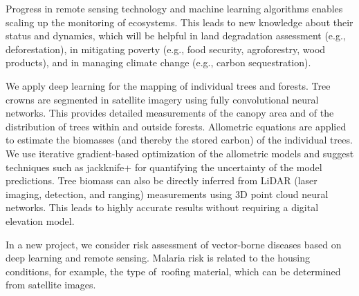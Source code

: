 \documentclass[a4paper,UKenglish]{dagrep-v2021}
\begin{document}
\license
{}

Progress in remote sensing technology and machine learning algorithms enables scaling up the monitoring of ecosystems. This leads to new knowledge about their status and dynamics, which will be helpful in land degradation assessment (e.g., deforestation), in mitigating poverty (e.g., food security, agroforestry, wood products), and in managing climate change (e.g., carbon sequestration).

We apply deep learning for the mapping of individual trees and forests. Tree crowns are segmented in satellite imagery using fully convolutional neural networks. This provides detailed measurements of the canopy area and of the distribution of trees within and outside forests. Allometric equations are applied to estimate the biomasses (and thereby the stored carbon) of the individual trees. We use iterative gradient-based optimization of the allometric models and suggest techniques such as  jackknife+ for quantifying the uncertainty of the model predictions. Tree biomass can also be directly inferred from LiDAR (laser imaging, detection, and ranging) measurements using 3D point cloud neural networks. This leads to highly accurate results without requiring a digital elevation model. 

In a new project, we consider risk assessment of vector-borne diseases based on deep learning and remote sensing. Malaria risk is related to the housing conditions, for example, the type of roofing material, which can be determined from satellite images.

\license
\end{document}

